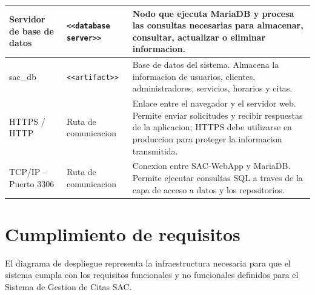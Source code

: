 \documentclass[12pt,letterpaper]{article}
\begin{document}
\begin{center}
\begin{longtable}{|Y{3.15cm}|Y{3.65cm}|Y{8cm}|}
Servidor de base de datos & \texttt{<<database server>>} & Nodo que ejecuta MariaDB y procesa las consultas necesarias para almacenar, consultar, actualizar o eliminar informacion. \\
\hline

sac\_db & \texttt{<<artifact>>} & Base de datos del sistema. Almacena la informacion de usuarios, clientes, administradores, servicios, horarios y citas. \\
\hline

HTTPS / HTTP & Ruta de comunicacion & Enlace entre el navegador y el servidor web. Permite enviar solicitudes y recibir respuestas de la aplicacion; HTTPS debe utilizarse en produccion para proteger la informacion transmitida. \\
\hline

TCP/IP -- Puerto 3306 & Ruta de comunicacion & Conexion entre SAC-WebApp y MariaDB. Permite ejecutar consultas SQL a traves de la capa de acceso a datos y los repositorios. \\
\hline
\end{longtable}
\end{center}

\section{Cumplimiento de requisitos}

El diagrama de despliegue representa la infraestructura necesaria para que el sistema cumpla con los requisitos funcionales y no funcionales definidos para el Sistema de Gestion de Citas SAC.
\end{document}
